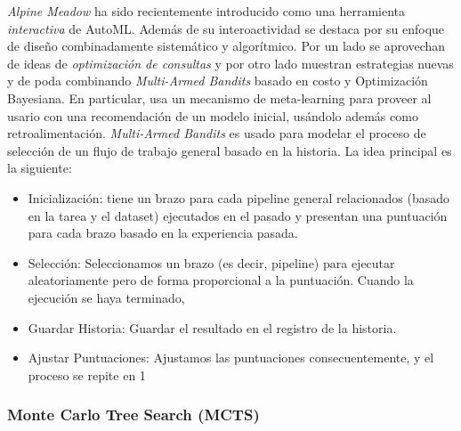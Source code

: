 \textit{Alpine Meadow} \cite{shang2019democratizing} ha sido recientemente introducido como una herramienta \emph{interactiva} de AutoML. Además de su interoactividad se destaca por su enfoque de diseño combinadamente sistemático y algorítmico. Por un lado se aprovechan de ideas de \textit{optimización de consultas} y por otro lado muestran estrategias nuevas y de poda combinando \textit{Multi-Armed Bandits} basado en costo y Optimización Bayesiana. En particular, usa un mecanismo de meta-learning para proveer al usario con una recomendación de un modelo inicial, usándolo además como retroalimentación. \textit{Multi-Armed Bandits} es usado para modelar el proceso de selección de un flujo de trabajo general basado en la historia. La idea principal es la siguiente: 
\begin{itemize}
	\item Inicialización: tiene un brazo para cada pipeline general relacionados (basado en la tarea y el dataset) ejecutados en el pasado y presentan una puntuación para cada brazo basado en la experiencia pasada.
	\item Selección: Seleccionamos un brazo (es decir, pipeline) para ejecutar aleatoriamente pero de forma proporcional a la puntuación. Cuando la ejecución se haya terminado,
	\item Guardar Historia: Guardar el resultado en el registro de la historia.
	\item Ajustar Puntuaciones: Ajustamos las puntuaciones consecuentemente, y el proceso se repite en 1
\end{itemize}


\subsubsection{Monte Carlo Tree Search (MCTS)}



